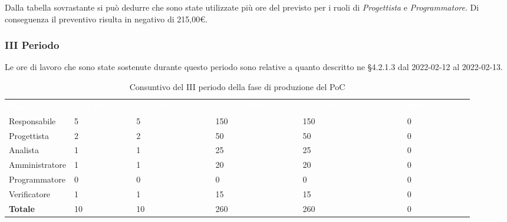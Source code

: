 Dalla tabella sovrastante si può dedurre che sono state utilizzate più ore del previsto per i ruoli di \textit{Progettista} e \textit{Programmatore}. Di conseguenza il preventivo risulta in negativo di 215,00\euro.

\pagebreak

\subsubsection{III Periodo}
Le ore di lavoro che sono state sostenute durante questo periodo sono relative a quanto descritto ne §4.2.1.3 dal 2022-02-12 al 2022-02-13.

\begin{table}[H]
\begin{center}
\renewcommand{\arraystretch}{1.5}
\begin{tabular}{ m{}<{\centering}  m{}<{\centering} m{}<{\centering} m{}<{\centering} m{}<{\centering} m{}<{\centering}}
	\rowcolor{darkblue}
	\textcolor{white}{\textbf{Ruolo}} & \textcolor{white}{\textbf{Ore Effettive}} & \textcolor{white}{\textbf{Ore Preventivate}}&\textcolor{white}{\textbf{Costo Effettivo (\euro)}}&\textcolor{white}{\textbf{Costo Preventivato (\euro)}}&\textcolor{white}{\textbf{Differenza (\euro)}}\\ 
	
	Responsabile  & 5 & 5 & 150 & 150 & 0\\	
	
	Progettista & 2 & 2 & 50 & 50 & 0\\
	
	Analista & 1  & 1 & 25 & 25 & 0 \\

	Amministratore & 1 & 1 & 20 & 20 & 0 \\
	
	Programmatore & 0 &0 &0 & 0 & 0 \\
	
	Verificatore & 1 & 1 & 15 & 15 & 0 \\
	
	\textbf{Totale} & 10 & 10 & 260 & 260 & 0 \\
	
\end{tabular}
\caption{Consuntivo del III periodo della fase di produzione del PoC}
\end{center}
\end{table}

